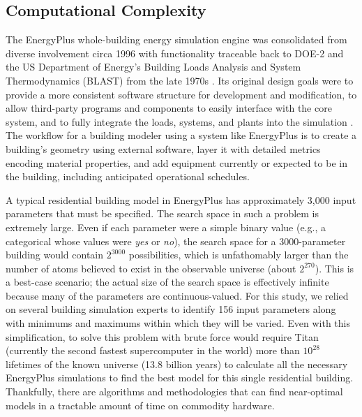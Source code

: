 \documentclass[preprint, review, 12pt]{elsarticle}
\begin{document}
\subsection{Computational Complexity}
The EnergyPlus whole-building energy simulation engine was consolidated from diverse involvement circa 1996 with functionality traceable back to DOE-2 and the US Department of Energy's Building Loads Analysis and System Thermodynamics (BLAST) from the late 1970s \cite{cit:energyplus}. Its original design goals were to provide a more consistent software structure for development and modification, to allow third-party programs and components to easily interface with the core system, and to fully integrate the loads, systems, and plants into the simulation \cite{cit:energyplus}. The workflow for a building modeler using a system like EnergyPlus is to create a building's geometry using external software, layer it with detailed metrics encoding material properties, and add equipment currently or expected to be in the building, including anticipated operational schedules.

A typical residential building model in EnergyPlus has approximately 3,000 input parameters that must be specified. The search space in such a problem is extremely large. Even if each parameter were a simple binary value (e.g., a categorical whose values were \emph{yes} or \emph{no}), the search space for a 3000-parameter building would contain $2^{3000}$ possibilities, which is unfathomably larger than the number of atoms believed to exist in the observable universe (about $2^{270}$). This is a best-case scenario; the actual size of the search space is effectively infinite because many of the parameters are continuous-valued. For this study, we relied on several building simulation experts to identify 156 input parameters along with minimums and maximums within which they will be varied. Even with this simplification, to solve this problem with brute force would require Titan (currently the second fastest supercomputer in the world) more than $10^{28}$ lifetimes of the known universe (13.8 billion years) to calculate all the necessary EnergyPlus simulations to find the best model for this single residential building. Thankfully, there are algorithms and methodologies that can find near-optimal models in a tractable amount of time on commodity hardware.
\end{document}
